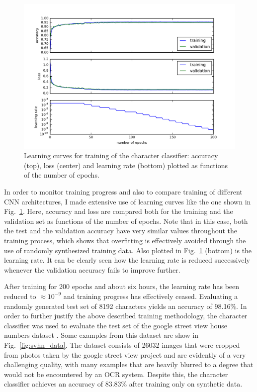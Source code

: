 \documentclass[12pt]{article}
\newcommand\figref[1]{Fig.~\ref{fig:#1}}
\begin{document}
%

\begin{figure}[t!]
  \centering
  \includegraphics{fig/learning_curve}
  \caption{
    Learning curves for training of the character classifier:
    accuracy (top), loss (center) and learning rate (bottom) plotted as functions of
    the number of epochs.
    \label{fig:learning_curve}
  }
\end{figure}

In order to monitor training progress and also to compare training of different CNN architectures,
I made extensive use of learning curves like the one shown in \figref{learning_curve}.
Here, accuracy and loss are compared both for the training and the validation set as functions
of the number of epochs. Note that in this case, both the test and the validation accuracy
have very similar values throughout the training process,
which shows that overfitting is effectively avoided through
the use of randomly synthesized training data. Also plotted in \figref{learning_curve} (bottom)
is the learning rate. It can be clearly seen how the learning rate is reduced successively
whenever the validation accuracy fails to improve further.

After training for 200 epochs and about six hours, the learning rate has been reduced to $\approx 10^{-9}$ and training progress
has effectively ceased. Evaluating a randomly generated test set of 8192 characters yields
an accuracy of 98.16\%. In order to further justify the above described training methodology,
the character classifier was used to evaluate the test set of the google street view house numbers dataset
\cite{Netzer2011,TheStree9:online}. Some examples from this dataset are show in \figref{svhn_data}.
The dataset consists of 26032 images that were cropped from photos taken by the
google street view project and are evidently of a very challenging quality, with many examples that are heavily blurred to a
degree that would not be encountered by an OCR system. Despite this, the character classifier
achieves an accuracy of 83.83\% after training only on synthetic data.
\end{document}
